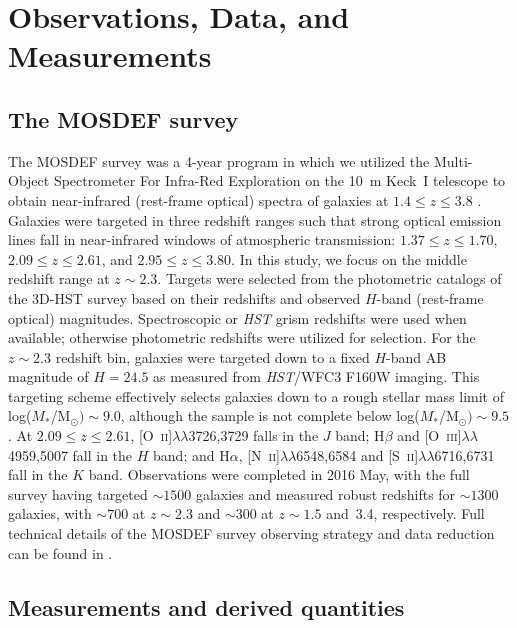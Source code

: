 \documentclass[iop,twocolappendix]{emulateapj}
\newcommand{\ii}{~\textsc{ii}}
\newcommand{\iii}{~\textsc{iii}}
\begin{document}
\section{Observations, Data, and Measurements}\label{sec2}

\subsection{The MOSDEF survey}

The MOSDEF
 survey was a 4-year program in which we utilized the Multi-Object
 Spectrometer For Infra-Red Exploration \citep[MOSFIRE;][]{mcl12} on the 10~m Keck~I telescope
 to obtain near-infrared (rest-frame optical) spectra of galaxies at $1.4\leq z\leq3.8$ \citep{kri15}.
  Galaxies were targeted in three redshift ranges such that strong optical emission lines fall
 in near-infrared windows of atmospheric transmission: $1.37\leq z\leq1.70$, $2.09\leq z\leq2.61$,
 and $2.95\leq z\leq3.80$.  In this study, we focus on the middle redshift range at $z\sim2.3$.
  Targets were selected from the photometric catalogs of the 3D-HST survey
 \citep{bra12,ske14,mom16} based on their redshifts and observed $H$-band (rest-frame optical) magnitudes.
  Spectroscopic or \textit{HST} grism redshifts were used when available; otherwise photometric
 redshifts were utilized for selection.  For the $z\sim2.3$ redshift bin, galaxies were targeted
 down to a fixed $H$-band AB magnitude of $H=24.5$ as measured from \textit{HST}/WFC3 F160W imaging.
  This targeting scheme effectively selects galaxies down to a rough stellar mass limit of
 log($M_*$/M$_{\odot})\sim9.0$, although the sample is not complete below log($M_*$/M$_{\odot})\sim9.5$
 \citep[see][]{shi15}.
  At $2.09\leq z\leq2.61$, [O\ii]$\lambda\lambda$3726,3729 falls
 in the $J$ band; H$\beta$ and [O\iii]$\lambda\lambda$4959,5007 fall in the $H$ band; and
 H$\alpha$, [N\ii]$\lambda\lambda$6548,6584 and [S\ii]$\lambda\lambda$6716,6731 fall in the $K$ band.
  Observations were completed in 2016 May, with the full survey having targeted
 $\sim1500$ galaxies and measured robust redshifts for $\sim1300$ galaxies, with $\sim700$
 at $z\sim2.3$ and $\sim300$ at $z\sim1.5$ and~3.4, respectively.
  Full technical details of the MOSDEF survey observing strategy and data reduction can be found
 in \citet{kri15}.

\subsection{Measurements and derived quantities}
\end{document}
